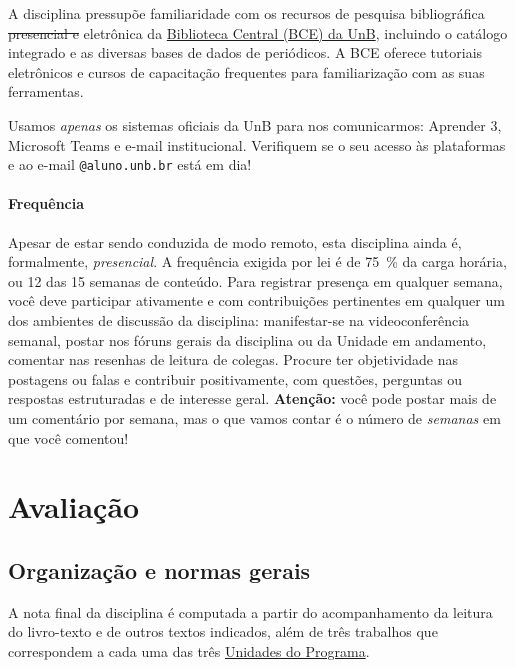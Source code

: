 \documentclass[
  11pt,
  brazil,
  a4paper,
]{article}
\begin{document}
A disciplina pressupõe familiaridade com os recursos de pesquisa
bibliográfica \sout{presencial e} eletrônica da
\href{https://bce.unb.br}{Biblioteca Central (BCE) da UnB}, incluindo o
catálogo integrado e as diversas bases de dados de periódicos. A BCE
oferece tutoriais eletrônicos e cursos de capacitação frequentes para
familiarização com as suas ferramentas.

Usamos \emph{apenas} os sistemas oficiais da UnB para nos comunicarmos:
Aprender 3, Microsoft Teams e e-mail institucional. Verifiquem se o seu
acesso às plataformas e ao e-mail \texttt{@aluno.unb.br} está em dia!

\hypertarget{frequuxeancia}{%
\paragraph{Frequência}\label{frequuxeancia}}

Apesar de estar sendo conduzida de modo remoto, esta disciplina ainda é,
formalmente, \emph{presencial}. A frequência exigida por lei é de 75~\%
da carga horária, ou 12 das 15 semanas de conteúdo. Para registrar
presença em qualquer semana, você deve participar ativamente e com
contribuições pertinentes em qualquer um dos ambientes de discussão da
disciplina: manifestar-se na videoconferência semanal, postar nos fóruns
gerais da disciplina ou da Unidade em andamento, comentar nas resenhas
de leitura de colegas. Procure ter objetividade nas postagens ou falas e
contribuir positivamente, com questões, perguntas ou respostas
estruturadas e de interesse geral. \textbf{Atenção:} você pode postar
mais de um comentário por semana, mas o que vamos contar é o número de
\emph{semanas} em que você comentou!

\hypertarget{avaliauxe7uxe3o}{%
\section{Avaliação}\label{avaliauxe7uxe3o}}

\hypertarget{organizauxe7uxe3o-e-normas-gerais}{%
\subsection{Organização e normas
gerais}\label{organizauxe7uxe3o-e-normas-gerais}}

A nota final da disciplina é computada a partir do acompanhamento da
leitura do livro-texto e de outros textos indicados, além de três
trabalhos que correspondem a cada uma das três
\href{plano-programa.md}{Unidades do Programa}.
\end{document}
